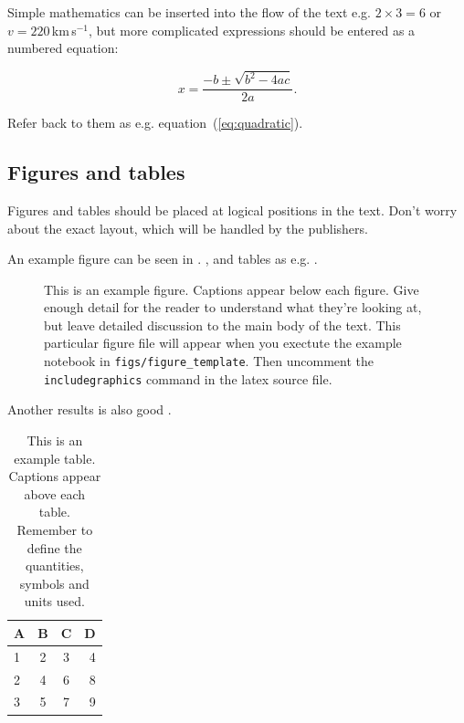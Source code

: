 \documentclass[fleqn,usenatbib]{mnras}
\begin{document}
Simple mathematics can be inserted into the flow of the text e.g. $2\times3=6$
or $v=220$\,km\,s$^{-1}$, but more complicated expressions should be entered
as a numbered equation:

\begin{equation}
    x=\frac{-b\pm\sqrt{b^2-4ac}}{2a}.
	\label{eq:quadratic}
\end{equation}

Refer back to them as e.g. equation~(\ref{eq:quadratic}).

\subsection{Figures and tables}

Figures and tables should be placed at logical positions in the text. Don't
worry about the exact layout, which will be handled by the publishers.

An example figure can be seen in .
, and tables as
e.g. .

\begin{figure}

  \caption{This is an example figure. Captions appear below each
    figure.  Give enough detail for the reader to understand what
    they're looking at, but leave detailed discussion to the main body
    of the text.  This particular figure file will appear when you
    exectute the example notebook in
    \texttt{figs/figure\_template}. Then uncomment the
    \texttt{includegraphics} command in the latex source file.} 
\end{figure}

Another results is also good .
\begin{table}
	\centering
	\caption{This is an example table. Captions appear above each table.
	Remember to define the quantities, symbols and units used.}
	\begin{tabular}{lccr} %
		\hline
		A & B & C & D\\
		\hline
		1 & 2 & 3 & 4\\
		2 & 4 & 6 & 8\\
		3 & 5 & 7 & 9\\
		\hline
	\end{tabular}
\end{table}
\end{document}
